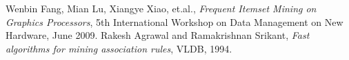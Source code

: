 \documentclass[conference]{IEEEtran}
\begin{document}
%










%
%
%
\begin{thebibliography}{1}
Wenbin Fang, Mian Lu, Xiangye Xiao, et.al., \emph{Frequent Itemset Mining on Graphics Processors}, 5th International Workshop on Data Management on New Hardware, June 2009.
Rakesh Agrawal and Ramakrishnan Srikant, \emph{Fast algorithms for mining association rules}, VLDB, 1994.

\end{thebibliography}




\end{document}
